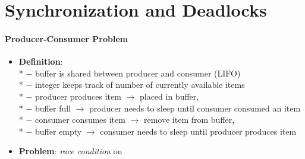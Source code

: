 \section{Synchronization and Deadlocks}

\paragraph{Producer-Consumer Problem}
\begin{itemize}
  \item \textbf{Definition}: \\*
    $ - $ buffer is shared between producer and consumer (LIFO) \\*
    $ - $  integer keeps track of number of currently available items \\*
    $ - $ producer produces item $ \to $ placed in buffer,  \\*
    $ - $ buffer full $ \to $ producer needs to sleep until consumer consumed an item \\*
    $ - $ consumer consumes item $ \to $ remove item from buffer,  \\*
    $ - $ buffer empty $ \to $ consumer needs to sleep until producer produces item
  \item \textbf{Problem}: \emph{race condition} on 
\end{itemize}

